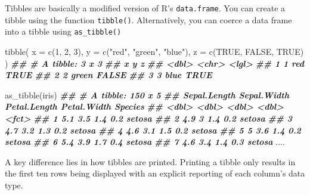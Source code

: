 \documentclass[
]{book}
\newenvironment{Shaded}{\begin{snugshade}}{\end{snugshade}}
\newcommand{\AttributeTok}[1]{\textcolor[rgb]{0.77,0.63,0.00}{#1}}
\newcommand{\ConstantTok}[1]{\textcolor[rgb]{0.00,0.00,0.00}{#1}}
\newcommand{\DecValTok}[1]{\textcolor[rgb]{0.00,0.00,0.81}{#1}}
\newcommand{\DocumentationTok}[1]{\textcolor[rgb]{0.56,0.35,0.01}{\textbf{\textit{#1}}}}
\newcommand{\FunctionTok}[1]{\textcolor[rgb]{0.00,0.00,0.00}{#1}}
\newcommand{\NormalTok}[1]{#1}
\newcommand{\StringTok}[1]{\textcolor[rgb]{0.31,0.60,0.02}{#1}}
\begin{document}
Tibbles are basically a modified version of R's \texttt{data.frame}. You can create a tibble using the function \texttt{tibble()}. Alternatively, you can coerce a data frame into a tibble using \texttt{as\_tibble()}

\begin{Shaded}
\begin{Highlighting}[]
\FunctionTok{tibble}\NormalTok{(}
  \AttributeTok{x =} \FunctionTok{c}\NormalTok{(}\DecValTok{1}\NormalTok{, }\DecValTok{2}\NormalTok{, }\DecValTok{3}\NormalTok{),}
  \AttributeTok{y =} \FunctionTok{c}\NormalTok{(}\StringTok{"red"}\NormalTok{, }\StringTok{"green"}\NormalTok{, }\StringTok{"blue"}\NormalTok{),}
  \AttributeTok{z =} \FunctionTok{c}\NormalTok{(}\ConstantTok{TRUE}\NormalTok{, }\ConstantTok{FALSE}\NormalTok{, }\ConstantTok{TRUE}\NormalTok{)}
\NormalTok{)}
\DocumentationTok{\#\# \# A tibble: 3 x 3}
\DocumentationTok{\#\#       x y     z    }
\DocumentationTok{\#\#   \textless{}dbl\textgreater{} \textless{}chr\textgreater{} \textless{}lgl\textgreater{}}
\DocumentationTok{\#\# 1     1 red   TRUE }
\DocumentationTok{\#\# 2     2 green FALSE}
\DocumentationTok{\#\# 3     3 blue  TRUE}

\FunctionTok{as\_tibble}\NormalTok{(iris)}
\DocumentationTok{\#\# \# A tibble: 150 x 5}
\DocumentationTok{\#\#    Sepal.Length Sepal.Width Petal.Length Petal.Width Species}
\DocumentationTok{\#\#           \textless{}dbl\textgreater{}       \textless{}dbl\textgreater{}        \textless{}dbl\textgreater{}       \textless{}dbl\textgreater{} \textless{}fct\textgreater{}  }
\DocumentationTok{\#\#  1          5.1         3.5          1.4         0.2 setosa }
\DocumentationTok{\#\#  2          4.9         3            1.4         0.2 setosa }
\DocumentationTok{\#\#  3          4.7         3.2          1.3         0.2 setosa }
\DocumentationTok{\#\#  4          4.6         3.1          1.5         0.2 setosa }
\DocumentationTok{\#\#  5          5           3.6          1.4         0.2 setosa }
\DocumentationTok{\#\#  6          5.4         3.9          1.7         0.4 setosa }
\DocumentationTok{\#\#  7          4.6         3.4          1.4         0.3 setosa }
\NormalTok{....}
\end{Highlighting}
\end{Shaded}

A key difference lies in how tibbles are printed. Printing a tibble only results in the first ten rows being displayed with an explicit reporting of each column's data type.
\end{document}
